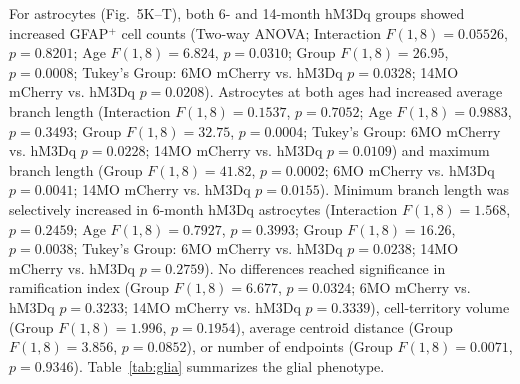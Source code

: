 \documentclass[11pt]{article}
\begin{document}
For astrocytes (Fig.~5K--T), both 6- and 14-month hM3Dq groups showed increased GFAP$^{+}$ cell counts (Two-way ANOVA; Interaction $F(1,8)=0.05526$, $p=0.8201$; Age $F(1,8)=6.824$, $p=0.0310$; Group $F(1,8)=26.95$, $p=0.0008$; Tukey's Group: 6MO mCherry vs. hM3Dq $p=0.0328$; 14MO mCherry vs. hM3Dq $p=0.0208$). Astrocytes at both ages had increased average branch length (Interaction $F(1,8)=0.1537$, $p=0.7052$; Age $F(1,8)=0.9883$, $p=0.3493$; Group $F(1,8)=32.75$, $p=0.0004$; Tukey's Group: 6MO mCherry vs. hM3Dq $p=0.0228$; 14MO mCherry vs. hM3Dq $p=0.0109$) and maximum branch length (Group $F(1,8)=41.82$, $p=0.0002$; 6MO mCherry vs. hM3Dq $p=0.0041$; 14MO mCherry vs. hM3Dq $p=0.0155$). Minimum branch length was selectively increased in 6-month hM3Dq astrocytes (Interaction $F(1,8)=1.568$, $p=0.2459$; Age $F(1,8)=0.7927$, $p=0.3993$; Group $F(1,8)=16.26$, $p=0.0038$; Tukey's Group: 6MO mCherry vs. hM3Dq $p=0.0238$; 14MO mCherry vs. hM3Dq $p=0.2759$). No differences reached significance in ramification index (Group $F(1,8)=6.677$, $p=0.0324$; 6MO mCherry vs. hM3Dq $p=0.3233$; 14MO mCherry vs. hM3Dq $p=0.3339$), cell-territory volume (Group $F(1,8)=1.996$, $p=0.1954$), average centroid distance (Group $F(1,8)=3.856$, $p=0.0852$), or number of endpoints (Group $F(1,8)=0.0071$, $p=0.9346$). Table~\ref{tab:glia} summarizes the glial phenotype.
\end{document}
